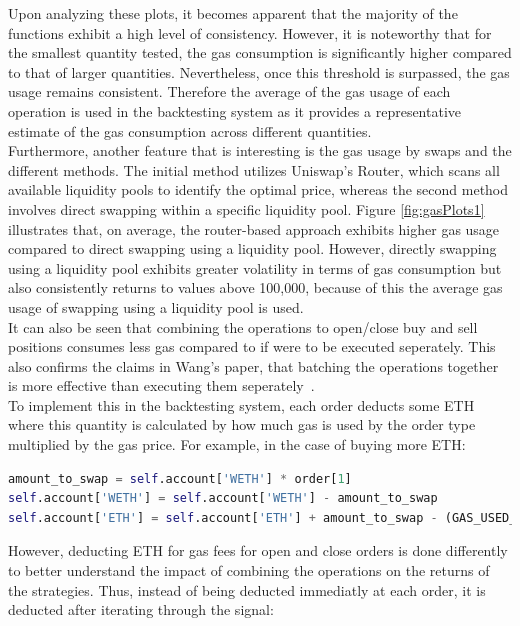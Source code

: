 \noindent Upon analyzing these plots, it becomes apparent that the majority of the functions exhibit a high level of consistency. However, it is noteworthy that for the smallest quantity tested, the gas consumption is significantly higher compared to that of larger quantities. Nevertheless, once this threshold is surpassed, the gas usage remains consistent. Therefore the average of the gas usage of each operation is used in the backtesting system as it provides a representative estimate of the gas consumption across different quantities.
\\[3mm]
Furthermore, another feature that is interesting is the gas usage by swaps and the different methods. The initial method utilizes Uniswap's Router, which scans all available liquidity pools to identify the optimal price, whereas the second method involves direct swapping within a specific liquidity pool. Figure \ref{fig:gasPlots1} illustrates that, on average, the router-based approach exhibits higher gas usage compared to direct swapping using a liquidity pool. However, directly swapping using a liquidity pool exhibits greater volatility in terms of gas consumption but also consistently returns to values above 100,000, because of this the average gas usage of swapping using a liquidity pool is used.
\\[3mm]
It can also be seen that combining the operations to open/close buy and sell positions consumes less gas compared to if were to be executed seperately. This also confirms the claims in Wang's paper, that batching the operations together is more effective than executing them seperately~\cite{wang_cyclic_2022}.
\\[3mm]
To implement this in the backtesting system, each order deducts some ETH where this quantity is calculated by how much gas is used by the order type multiplied by the gas price. For example, in the case of buying more ETH:
\vspace{5mm}
\begin{lstlisting}[language=Python]
amount_to_swap = self.account['WETH'] * order[1]
self.account['WETH'] = self.account['WETH'] - amount_to_swap
self.account['ETH'] = self.account['ETH'] + amount_to_swap - (GAS_USED_BY_BUYING_ETH * gas_price_in_eth)
\end{lstlisting}
\vspace{5mm}
\noindent However, deducting ETH for gas fees for open and close orders is done differently to better understand the impact of combining the operations on the returns of the strategies. Thus, instead of being deducted immediatly at each order, it is deducted after iterating through the signal:

